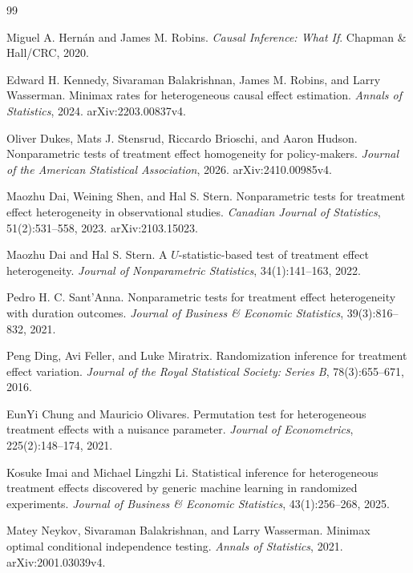 \documentclass{article}
\begin{document}
\begin{thebibliography}{99}

   Miguel A. Hernán and James M. Robins. \emph{Causal Inference: What If}. Chapman \& Hall/CRC, 2020.

   Edward H. Kennedy, Sivaraman Balakrishnan, James M. Robins, and Larry Wasserman. Minimax rates for heterogeneous causal effect estimation. \emph{Annals of Statistics}, 2024. arXiv:2203.00837v4.

   Oliver Dukes, Mats J. Stensrud, Riccardo Brioschi, and Aaron Hudson. Nonparametric tests of treatment effect homogeneity for policy-makers. \emph{Journal of the American Statistical Association}, 2026. arXiv:2410.00985v4.

   Maozhu Dai, Weining Shen, and Hal S. Stern. Nonparametric tests for treatment effect heterogeneity in observational studies. \emph{Canadian Journal of Statistics}, 51(2):531--558, 2023. arXiv:2103.15023.

   Maozhu Dai and Hal S. Stern. A \(U\)-statistic-based test of treatment effect heterogeneity. \emph{Journal of Nonparametric Statistics}, 34(1):141--163, 2022.

   Pedro H. C. Sant'Anna. Nonparametric tests for treatment effect heterogeneity with duration outcomes. \emph{Journal of Business \& Economic Statistics}, 39(3):816--832, 2021.

   Peng Ding, Avi Feller, and Luke Miratrix. Randomization inference for treatment effect variation. \emph{Journal of the Royal Statistical Society: Series B}, 78(3):655--671, 2016.

   EunYi Chung and Mauricio Olivares. Permutation test for heterogeneous treatment effects with a nuisance parameter. \emph{Journal of Econometrics}, 225(2):148--174, 2021.

   Kosuke Imai and Michael Lingzhi Li. Statistical inference for heterogeneous treatment effects discovered by generic machine learning in randomized experiments. \emph{Journal of Business \& Economic Statistics}, 43(1):256--268, 2025.

   Matey Neykov, Sivaraman Balakrishnan, and Larry Wasserman. Minimax optimal conditional independence testing. \emph{Annals of Statistics}, 2021. arXiv:2001.03039v4.


\end{thebibliography}
\end{document}
